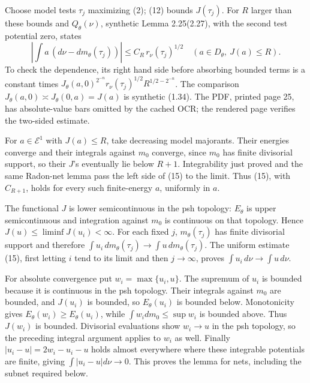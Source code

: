 \documentclass[11pt]{article}
\begin{document}
Choose model tests \(\tau_j\) maximizing (2); (12) bounds \(J(\tau_j)\). For \(R\) larger than these bounds and \(Q_\theta(\nu)\), synthetic Lemma 2.25(2.27), with the second test potential zero, states
\[
 \left|\int a\,(d\nu-dm_\theta(\tau_j))\right|
 \leq C_R\,r_\nu(\tau_j)^{1/2}
 \quad(a\in D_\theta,\ J(a)\leq R).
 \tag{15}
\]
To check the dependence, its right hand side before absorbing bounded terms is a constant times \(J_\theta(a,0)^{2^{-n}}r_\nu(\tau_j)^{1/2}R^{1/2-2^{-n}}\). The comparison \(J_\theta(a,0)\asymp J_\theta(0,a)=J(a)\) is synthetic (1.34). The PDF, printed page 25, has absolute-value bars omitted by the cached OCR; the rendered page verifies the two-sided estimate.

For \(a\in\mathcal E^1\) with \(J(a)\leq R\), take decreasing model majorants. Their energies converge and their integrals against \(m_0\) converge, since \(m_0\) has finite divisorial support, so their \(J\)'s eventually lie below \(R+1\). Integrability just proved and the same Radon-net lemma pass the left side of (15) to the limit. Thus (15), with \(C_{R+1}\), holds for every such finite-energy \(a\), uniformly in \(a\).

The functional \(J\) is lower semicontinuous in the psh topology: \(E_\theta\) is upper semicontinuous and integration against \(m_0\) is continuous on that topology. Hence \(J(u)\leq\liminf J(u_i)<\infty\). For each fixed \(j\), \(m_\theta(\tau_j)\) has finite divisorial support and therefore \(\int u_i\,dm_\theta(\tau_j)\to\int u\,dm_\theta(\tau_j)\). The uniform estimate (15), first letting \(i\) tend to its limit and then \(j\to\infty\), proves \(\int u_i\,d\nu\to\int u\,d\nu\).

For absolute convergence put \(w_i=\max\{u_i,u\}\). The supremum of \(u_i\) is bounded because it is continuous in the psh topology. Their integrals against \(m_0\) are bounded, and \(J(u_i)\) is bounded, so \(E_\theta(u_i)\) is bounded below. Monotonicity gives \(E_\theta(w_i)\geq E_\theta(u_i)\), while \(\int w_i dm_0\leq\sup w_i\) is bounded above. Thus \(J(w_i)\) is bounded. Divisorial evaluations show \(w_i\to u\) in the psh topology, so the preceding integral argument applies to \(w_i\) as well. Finally \(|u_i-u|=2w_i-u_i-u\) holds almost everywhere where these integrable potentials are finite, giving \(\int|u_i-u|d\nu\to0\). This proves the lemma for nets, including the subnet required below.
\end{document}
